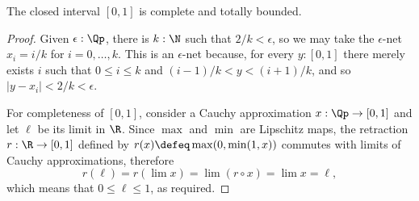 %
\begin{thm} \label{analysis-interval-ctb}
  The closed interval $[0,1]$ is complete and totally bounded.
\end{thm}

\begin{proof}
  Given $\epsilon : \Qp$, there is $k : \N$ such that $2/k < \epsilon$, so we may take the
  $\epsilon$-net $x_i = i/k$ for $i = 0, \ldots, k$. This is an $\epsilon$-net because,
  for every $y : [0,1]$ there merely exists $i$ such that $0 \leq i \leq k$ and $(i -
  1)/k < y < (i+1)/k$, and so $|y - x_i| < 2/k < \epsilon$.

  For completeness of $[0,1]$, consider a Cauchy approximation $x : \Qp \to
  [0,1]$ and let $\ell$ be its limit in $\R$. Since $\max$ and $\min$ are Lipschitz maps,
  the retraction $r : \R \to [0,1]$ defined by $r(x) \defeq \max(0, \min(1, x))$ commutes
  with limits of Cauchy approximations, therefore
  \begin{equation*}
    r(\ell) =
    r (\lim x) =
    \lim (r \circ x) =
    \lim x =
    \ell,
  \end{equation*}
  which means that $0 \leq \ell \leq 1$, as required.
\end{proof}
